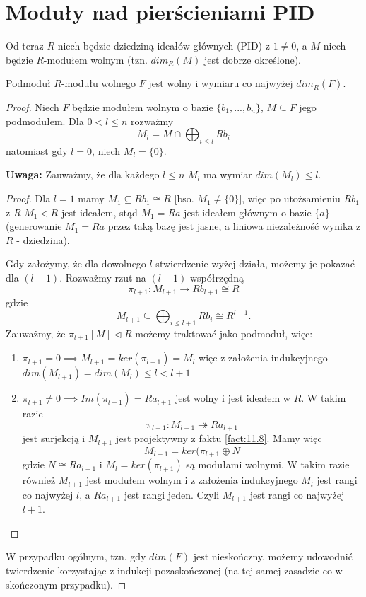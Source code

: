 \section{Moduły nad pierścieniami PID}

Od teraz $R$ niech będzie dziedziną ideałów głównych (PID) z $1\neq0$, a $M$ niech będzie $R$-modułem wolnym (tzn. $dim_R(M)$ jest dobrze określone).

\begin{theorem} Podmoduł $R$-modułu wolnego $F$ jest wolny i wymiaru co najwyżej $dim_R(F)$.
\end{theorem}

\begin{proof}
  Niech $F$ będzie modułem wolnym o bazie $\{b_1,...,b_n\}$, $M\subseteq F$ jego podmodułem. Dla $0<l\leq n$ rozważmy
  $$M_l=M\cap\bigoplus_{i\leq l}Rb_i$$
  natomiast gdy $l=0$, niech $M_l=\{0\}$.

  \textbf{Uwaga:} Zauważmy, że dla każdego $l\leq n$ $M_l$ ma wymiar $dim(M_l)\leq l$. 

  \begin{proof}
  Dla $l=1$ mamy $M_1\subseteq Rb_1\cong R$ [bso. $M_1\neq\{0\}]$, więc po utożsamieniu $Rb_1$ z $R$ $M_1\triangleleft R$ jest ideałem, stąd $M_1=Ra$ jest ideałem głównym o bazie $\{a\}$ (generowanie $M_1=Ra$ przez taką bazę jest jasne, a liniowa niezależność wynika z $R$ - dziedzina).

  Gdy założymy, że dla dowolnego $l$ stwierdzenie wyżej działa, możemy je pokazać dla $(l+1)$. Rozważmy rzut na $(l+1)$-współrzędną
  $$\pi_{l+1}:M_{l+1}\to Rb_{l+1}\cong R$$
  gdzie 
  $$M_{l+1}\subseteq\bigoplus_{i\leq l+1}Rb_i\cong R^{l+1}.$$
  Zauważmy, że $\pi_{l+1}[M]\triangleleft R$ możemy traktować jako podmoduł, więc:
  
  \begin{enumerate}
    \item $\pi_{l+1}=0\implies M_{l+1}=ker(\pi_{l+1})=M_l$ więc z założenia indukcyjnego $dim(M_{l+1})=dim(M_l)\leq l<l+1$
    \item $\pi_{l+1}\neq0\implies Im(\pi_{l+1})=Ra_{l+1}$ jest wolny i jest ideałem w $R$. W takim razie
      $$\pi_{l+1}:M_{l+1}\twoheadrightarrow Ra_{l+1}$$
      jest surjekcją i $M_{l+1}$ jest projektywny z faktu \ref{fact:11.8}. Mamy więc
      $$M_{l+1}=ker(\pi_{l+1}\oplus N$$
      gdzie $N\cong Ra_{l+1}$ i $M_l=ker(\pi_{l+1})$ są modułami wolnymi. W takim razie również $M_{l+1}$ jest modułem wolnym i z założenia indukcyjnego $M_l$ jest rangi co najwyżej $l$, a $Ra_{l+1}$ jest rangi jeden. Czyli $M_{l+1}$ jest rangi co najwyżej $l+1$.
  \end{enumerate}
  \end{proof}

  W przypadku ogólnym, tzn. gdy $dim(F)$ jest nieskończny, możemy udowodnić twierdzenie korzystając z indukcji pozaskończonej (na tej samej zasadzie co w skończonym przypadku).
\end{proof}

